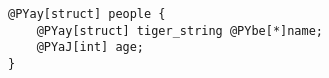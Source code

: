 \begin{Verbatim}[commandchars=@\[\]]
@PYay[struct] people {
    @PYay[struct] tiger_string @PYbe[*]name;
    @PYaJ[int] age;
}
\end{Verbatim}
